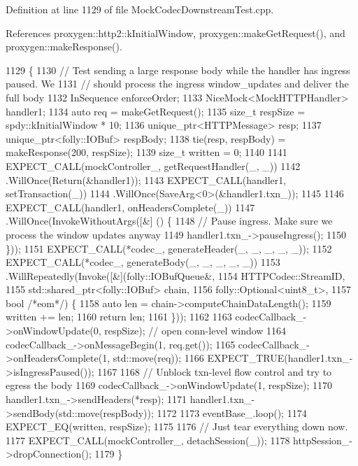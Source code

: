 Definition at line 1129 of file Mock\+Codec\+Downstream\+Test.\+cpp.



References proxygen\+::http2\+::k\+Initial\+Window, proxygen\+::make\+Get\+Request(), and proxygen\+::make\+Response().


\begin{DoxyCode}
1129                                                            \{
1130   \textcolor{comment}{// Test sending a large response body while the handler has ingress paused. We}
1131   \textcolor{comment}{// should process the ingress window\_updates and deliver the full body}
1132   InSequence enforceOrder;
1133   NiceMock<MockHTTPHandler> handler1;
1134   \textcolor{keyword}{auto} req = makeGetRequest();
1135   \textcolor{keywordtype}{size\_t} respSize = spdy::kInitialWindow * 10;
1136   unique\_ptr<HTTPMessage> resp;
1137   unique\_ptr<folly::IOBuf> respBody;
1138   tie(resp, respBody) = makeResponse(200, respSize);
1139   \textcolor{keywordtype}{size\_t} written = 0;
1140 
1141   EXPECT\_CALL(mockController\_, getRequestHandler(\_, \_))
1142     .WillOnce(Return(&handler1));
1143   EXPECT\_CALL(handler1, setTransaction(\_))
1144     .WillOnce(SaveArg<0>(&handler1.txn\_));
1145 
1146   EXPECT\_CALL(handler1, onHeadersComplete(\_))
1147     .WillOnce(InvokeWithoutArgs([&] () \{
1148           \textcolor{comment}{// Pause ingress. Make sure we process the window updates anyway}
1149           handler1.txn\_->pauseIngress();
1150         \}));
1151   EXPECT\_CALL(*codec\_, generateHeader(\_, \_, \_, \_, \_));
1152   EXPECT\_CALL(*codec\_, generateBody(\_, \_, \_, \_, \_))
1153       .WillRepeatedly(Invoke([&](folly::IOBufQueue&,
1154                                  HTTPCodec::StreamID,
1155                                  std::shared\_ptr<folly::IOBuf> chain,
1156                                  folly::Optional<uint8\_t>,
1157                                  \textcolor{keywordtype}{bool} \textcolor{comment}{/*eom*/}) \{
1158         \textcolor{keyword}{auto} len = chain->computeChainDataLength();
1159         written += len;
1160         \textcolor{keywordflow}{return} len;
1161       \}));
1162 
1163   codecCallback\_->onWindowUpdate(0, respSize); \textcolor{comment}{// open conn-level window}
1164   codecCallback\_->onMessageBegin(1, req.get());
1165   codecCallback\_->onHeadersComplete(1, std::move(req));
1166   EXPECT\_TRUE(handler1.txn\_->isIngressPaused());
1167 
1168   \textcolor{comment}{// Unblock txn-level flow control and try to egress the body}
1169   codecCallback\_->onWindowUpdate(1, respSize);
1170   handler1.txn\_->sendHeaders(*resp);
1171   handler1.txn\_->sendBody(std::move(respBody));
1172 
1173   eventBase\_.loop();
1174   EXPECT\_EQ(written, respSize);
1175 
1176   \textcolor{comment}{// Just tear everything down now.}
1177   EXPECT\_CALL(mockController\_, detachSession(\_));
1178   httpSession\_->dropConnection();
1179 \}
\end{DoxyCode}
